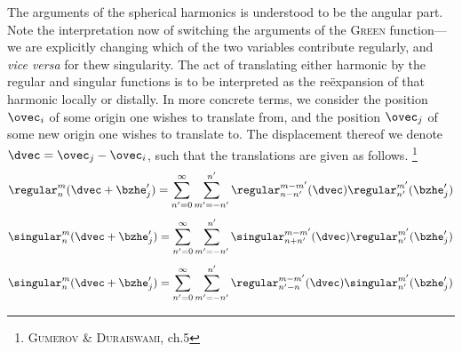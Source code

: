 \noindent
The arguments of the spherical harmonics is understood to be the angular part.
Note the interpretation now of switching the arguments of the \textsc{Green} function---we are explicitly changing which of the two variables contribute regularly, and \emph{vice versa} for thew singularity.
The act of translating either harmonic by the regular and singular functions is to be interpreted as the reëxpansion of that harmonic locally or distally.
In more concrete terms, we consider the position $\ovec_i$ of some origin one wishes to translate from, and the position $\ovec_j$ of some new origin one wishes to translate to.
The displacement thereof we denote $\dvec = \ovec_j - \ovec_i$, such that the translations are given as follows.%
\footnote{%
  \cite{gumerov2004fast} \textsc{Gumerov} \& \textsc{Duraiswami}, ch.5
}
%
\begin{equation}\label{eq:R2R}
  \regular_n^m (\dvec + \bzhe_j^{\prime}) = \sum_{n^{\prime} = 0}^{\infty} \sum_{m^{\prime} = -n^{\prime}}^{n^{\prime}} \regular_{n - n^{\prime}}^{m - m^{\prime}} (\dvec) \regular_{n^{\prime}}^{m^{\prime}} (\bzhe_{j}^{\prime})
\end{equation}
%
\begin{equation}\label{eq:S2R}
  \singular_n^m (\dvec + \bzhe_j^{\prime}) = \sum_{n^{\prime} = 0}^{\infty} \sum_{m^{\prime} = -n^{\prime}}^{n^{\prime}} \singular_{n + n^{\prime}}^{m - m^{\prime}} (\dvec) \regular_{n^{\prime}}^{m^{\prime}} (\bzhe_{j}^{\prime})
\end{equation}
%
\begin{equation}\label{eq:S2S}
  \singular_n^m (\dvec + \bzhe_j^{\prime}) = \sum_{n^{\prime} = 0}^{\infty} \sum_{m^{\prime} = -n^{\prime}}^{n^{\prime}} \regular_{n^{\prime} - n}^{m - m^{\prime}} (\dvec) \singular_{n^{\prime}}^{m^{\prime}} (\bzhe_{j}^{\prime})
\end{equation}

